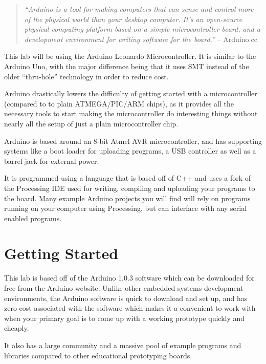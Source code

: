 \documentclass[11pt,a4paper]{article}
\begin{document}
\begin{quote}
\emph{``Arduino is a tool for making computers that can sense and control more of the physical world than your desktop computer. It's an open-source physical computing platform based on a simple microcontroller board, and a development environment for writing software for the board.''} -- Arduino.cc\cite{arduino_guide}
\end{quote}

This lab will be using the Arduino Leonardo Microcontroller\cite{leonardo}.  It is similar to the Arduino Uno\cite{uno}, with the major difference being that it uses SMT\cite{smt} instead of the older ``thru-hole''\cite{th} technology in order to reduce cost.

Arduino drastically lowers the difficulty of getting started with a microcontroller (compared to to plain ATMEGA/PIC/ARM chips), as it provides all the necessary tools to start making the microcontroller do interesting things without nearly all the setup of just a plain microcontroller chip.

Arduino is based around an 8-bit Atmel AVR microcontroller, and has supporting systems like a boot loader for uploading programs, a USB controller as well as a barrel jack for external power.

It is programmed using a language that is based off of C++ and uses a fork of the Processing IDE used for writing, compiling and uploading your programs to the board.  Many example Arduino projects you will find will rely on programs running on your computer using Processing, but can interface with any serial enabled programs.\cite{processing}




\section{Getting Started} %
\label{sec:getting_started}

This lab is based off of the Arduino 1.0.3 software which can be downloaded for free from the Arduino website.\cite{arduino_dl}  Unlike other embedded systems development environments, the Arduino software is quick to download and set up, and has zero cost associated with the software which makes it a convenient to work with when your primary goal is to come up with a working prototype quickly and cheaply.

It also has a large community and a massive pool of example programs and libraries compared to other educational prototyping boards.
\end{document}
